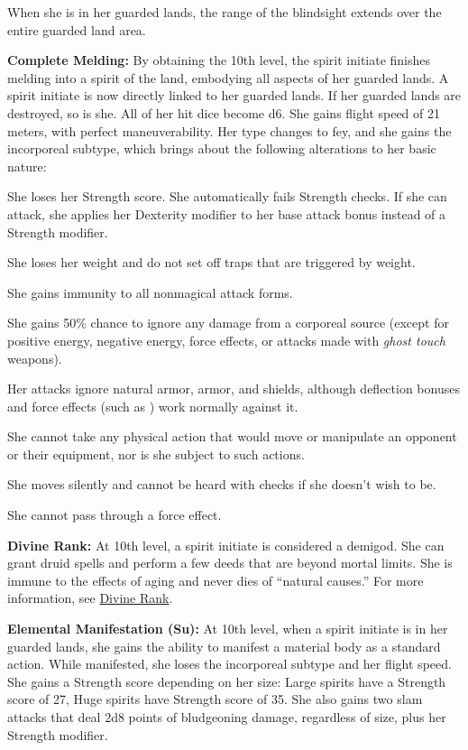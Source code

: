 {When she is in her guarded lands, the range of the blindsight extends over the entire guarded land area.

\textbf{Complete Melding:} By obtaining the 10th level, the spirit initiate finishes melding into a spirit of the land, embodying all aspects of her guarded lands. A spirit initiate is now directly linked to her guarded lands. If her guarded lands are destroyed, so is she. All of her hit dice become d6. She gains flight speed of 21 meters, with perfect maneuverability. Her type changes to fey, and she gains the incorporeal subtype, which brings about the following alterations to her basic nature:
\begin{itemize*}
\item She loses her Strength score. She automatically fails Strength checks. If she can attack, she applies her Dexterity modifier to her base attack bonus instead of a Strength modifier.
\item She loses her weight and do not set off traps that are triggered by weight.
\item She gains immunity to all nonmagical attack forms.
\item She gains 50\% chance to ignore any damage from a corporeal source (except for positive energy, negative energy, force effects, or attacks made with \emph{ghost touch} weapons).
\item Her attacks ignore natural armor, armor, and shields, although deflection bonuses and force effects (such as ) work normally against it.
\item She cannot take any physical action that would move or manipulate an opponent or their equipment, nor is she subject to such actions.
\item She moves silently and cannot be heard with  checks if she doesn't wish to be.
\item She cannot pass through a force effect.
\end{itemize*}

\textbf{Divine Rank:} At 10th level, a spirit initiate is considered a demigod. She can grant druid spells and perform a few deeds that are beyond mortal limits. She is immune to the effects of aging and never dies of ``natural causes.'' For more information, see \hyperref[Divine Rank]{Divine Rank}.
}

\textbf{Elemental Manifestation (Su):} At 10th level, when a spirit initiate is in her guarded lands, she gains the ability to manifest a material body as a standard action. While manifested, she loses the incorporeal subtype and her flight speed. She gains a Strength score depending on her size: Large spirits have a Strength score of 27, Huge spirits have Strength score of 35. She also gains two slam attacks that deal 2d8 points of bludgeoning damage, regardless of size, plus her Strength modifier.


